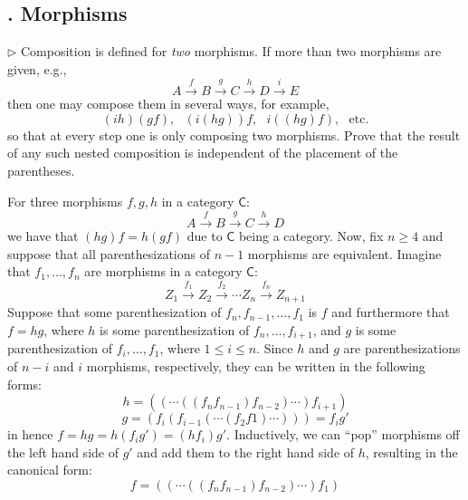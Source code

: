 \documentclass[12pt,letterpaper,boxed]{hmcpset}
\begin{document}
\subsection{. Morphisms}
\begin{problem}[4.1]
	$\rhd$ Composition is defined for \textit{two} morphisms. If more than two
	morphisms are given, e.g.,
	\[ A \xrightarrow{f} B \xrightarrow{g} C \xrightarrow{h} D \xrightarrow{i} E \]
	then one may compose them in several ways, for example,
	\[ (ih)(gf),\,\,\,\,(i(hg))f,\,\,\,\,i((hg)f),\,\,\,\,\text{etc.}\]
	so that at every step one is only composing two morphisms. Prove that the result
	of any such nested composition is independent of the placement of the
	parentheses.
\end{problem}
\begin{solution}
	For three morphisms $f,g,h$ in a category $\mathsf{C}$:
	\[ A \xrightarrow{f} B \xrightarrow{g} C \xrightarrow{h} D \]
	we have that $(hg)f = h(gf)$ due to $\mathsf{C}$ being a category. Now, fix $n\geq 4$
	and suppose that all parenthesizations of $n-1$ morphisms are equivalent.
	Imagine that $f_1, \dots, f_n$ are morphisms in a category $\mathsf{C}$:
	\[ Z_1 \xrightarrow{f_1} Z_2 \xrightarrow{f_2} \cdots Z_n \xrightarrow{f_n}
	Z_{n+1} \]
	Suppose that some parenthesization of $f_n, f_{n-1}, \dots, f_1$ is $f$ and
	furthermore that $f=hg$, where $h$ is some parenthesization of $f_n, \dots,
	f_{i+1}$, and $g$ is some parenthesization of $f_i, \dots, f_1$, where $1\leq
	i\leq n$. Since $h$ and $g$ are parenthesizations of $n-i$ and $i$ morphisms,
	respectively, they can be written in the following forms:
	\[ h = ((\cdots((f_nf_{n-1})f_{n-2})\cdots)f_{i+1}) \]
	\[ g = (f_i(f_{i-1}(\cdots(f_2f1)\cdots))) = f_ig' \]
	in hence $f=hg=h(f_ig')=(hf_i)g'$. Inductively, we can ``pop'' morphisms off the
	left hand side of $g'$ and add them to the right hand side of $h$, resulting in
	the canonical form:
	\[ f = ((\cdots((f_nf_{n-1})f_{n-2})\cdots)f_1) \]
\end{solution}
\end{document}
